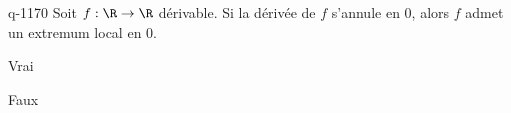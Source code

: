 \begin{truefalse}{q-1170}
Soit $f : \R \to \R$ dérivable. \newline Si la dérivée de $f$ s'annule en $0$, alors $f$ admet un extremum local en $0$.
\item Vrai
\item* Faux
\end{truefalse}

